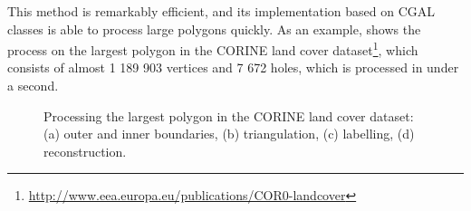 This method is remarkably efficient, and its implementation based on CGAL classes is able to process large polygons quickly.
As an example,  shows the process on the largest polygon in the CORINE land cover dataset\footnote{\url{http://www.eea.europa.eu/publications/COR0-landcover}}, which consists of almost 1 189 903 vertices and 7 672 holes, which is processed in under a second.
\begin{figure}
\caption[Processing the largest polygon in the CORINE land cover dataset]{Processing the largest polygon in the CORINE land cover dataset: (a) outer and inner boundaries, (b) triangulation, (c) labelling, (d) reconstruction.}
\label{fig:prepair}
\end{figure}

